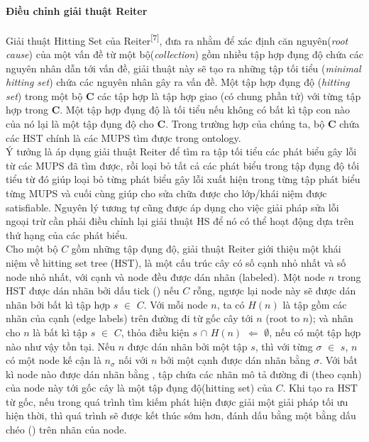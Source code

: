 \paragraph{Điều chỉnh giải thuật Reiter} Giải thuật Hitting Set của Reiter\textsuperscript{[7]}, đưa ra nhằm để xác định căn nguyên(\textit{root cause}) của một vấn đề từ một bộ(\textit{collection}) gồm nhiều tập hợp đụng độ chứa các nguyên nhân dẫn tới vấn đề, giải thuật này sẽ tạo ra những tập tối tiểu (\textit{minimal hitting set}) chứa các nguyên nhân gây ra vấn đề. Một tập hợp đụng độ (\textit{hitting set}) trong một bộ \textbf{C} các tập hợp là tập hợp giao (có chung phần tử) với từng tập hợp trong \textbf{C}. Một tập hợp đụng độ là tối tiểu nếu không có bất kì tập con nào của nó lại là một tập đụng độ cho \textbf{C}. Trong trường hợp của chúng ta, bộ \textbf{C} chứa các HST chính là các MUPS tìm được trong ontology.  \\\hspace*{.05\textwidth} Ý tưởng là áp dụng giải thuật Reiter để tìm ra tập tối tiểu các phát biểu gây lỗi từ các MUPS đã tìm được, rồi loại bỏ tất cả các phát biểu trong tập đụng độ tối tiểu từ đó giúp loại bỏ từng phát biểu gây lỗi xuất hiện trong từng tập phát biểu từng MUPS và cuối cùng giúp cho sửa chữa được cho lớp/khái niệm được satisfiable. Nguyên lý tương tự cũng được áp dụng cho việc giải pháp sửa lỗi ngoại trừ cần phải điều chỉnh lại giải thuật HS để nó có thể hoạt động dựa trên thứ hạng của các phát biểu.
\\\hspace*{.05\textwidth} Cho một bộ $C$ gồm những tập đụng độ, giải thuật Reiter giới thiệu một khái niệm về hitting set tree (HST), là một cấu trúc cây có số cạnh nhỏ nhất và số node nhỏ nhất, với cạnh và node đều được dán nhãn (labeled). Một node $n$ trong HST được dán nhãn bởi dấu tick (\cmark) nếu $C$ rỗng, ngược lại node này sẽ được dán nhãn bởi bất kì tập hợp $s$ $\in$ $C$. Với mỗi node $n$, ta có $H(n)$ là tập gồm các nhãn của cạnh (edge labels) trên đường đi từ gốc cây tới $n$ (root to $n$); và nhãn cho $n$ là bất kì tập $s$ $\in$ $C$, thỏa điều kiện $s$ $\cap$ $H(n)$ $\Leftarrow$ $\emptyset$, nếu có một tập hợp nào như vậy tồn tại. Nếu $n$ được dán nhãn bởi một tập $s$, thì với từng $\sigma$ $\in$ $s$, $n$ có một node kế cận là $n_{\sigma}$ nối với $n$ bởi một cạnh được dán nhãn bằng $\sigma$. Với bất kì node nào được dán nhãn bằng \cmark , tập chứa các nhãn mô tả đường đi (theo cạnh) của node này tới gốc cây là một tập đụng độ(hitting set) của $C$. Khi tạo ra HST từ gốc, nếu trong quá trình tìm kiếm phát hiện được giải một giải pháp tối ưu hiện thời, thì quá trình sẽ được kết thúc sớm hơn, đánh dấu bằng một bằng dấu chéo (\xmark) trên nhãn của node.
